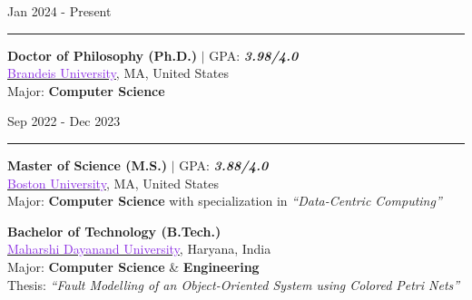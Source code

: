 \begin{minipage}[c]{0.20\textwidth}
	\hfill
	Jan 2024 \-- Present
\end{minipage}%
\hspace{0.01\textwidth}
\begin{minipage}[c]{0.02\textwidth}
	\textcolor{lightgray}{\rule{1pt}{1.2cm}}
\end{minipage}%
\begin{minipage}[c]{0.76\textwidth}
	\raggedright{
		\textbf{Doctor of Philosophy (Ph.D.)} $|$ GPA: \textbf{\textit{3.98/4.0}}\\
		\href{https://www.brandeis.edu/}{\textcolor{blueviolet}{Brandeis University}}, MA, United States\\
		Major: \textbf{Computer Science}\\
	}
\end{minipage}%

\mediumspace{}

\begin{minipage}[c]{0.20\textwidth}
	\hfill
	Sep 2022 \-- Dec 2023
\end{minipage}%
\hspace{0.01\textwidth}
\begin{minipage}[c]{0.02\textwidth}
	\textcolor{lightgray}{\rule{1pt}{1.2cm}}
\end{minipage}%
\begin{minipage}[c]{0.76\textwidth}
	\raggedright{
	\textbf{Master of Science (M.S.)} $|$ GPA: \textbf{\textit{3.88/4.0}}\\
	\href{https://www.bu.edu/}{\textcolor{blueviolet}{Boston University}}, MA, United States\\
	Major: \textbf{Computer Science} with specialization in \textit{“Data-Centric Computing''}\\
}
\end{minipage}%

\mediumspace{}

{
	\textbf{Bachelor of Technology (B.Tech.)}\\
	\href{https://mdu.ac.in/}{\textcolor{blueviolet}{Maharshi Dayanand University}}, Haryana, India\\
	Major: \textbf{Computer Science} \& \textbf{Engineering}\\
	Thesis: \textit{“Fault Modelling of an Object-Oriented System using Colored Petri Nets''}\\
}